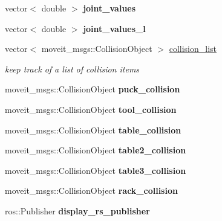 \begin{DoxyCompactItemize}
vector$<$ double $>$ {\bfseries joint\+\_\+values}
\item 
\mbox{\label{structManipulate_ae76888a71e1ac9ccb80b4bd1d4ffe944}} 
vector$<$ double $>$ {\bfseries joint\+\_\+values\+\_\+l}
\item 
\mbox{\label{structManipulate_a7cc8e6a4a253a98554ec30b616db1fbc}} 
vector$<$ moveit\+\_\+msgs\+::\+Collision\+Object $>$ \hyperlink{structManipulate_a7cc8e6a4a253a98554ec30b616db1fbc}{collision\+\_\+list}
\begin{DoxyCompactList}\small\item\em keep track of a list of collision items \end{DoxyCompactList}\item 
\mbox{\label{structManipulate_acc3904b461118f4e8330299129c02cd0}} 
moveit\+\_\+msgs\+::\+Collision\+Object {\bfseries puck\+\_\+collision}
\item 
\mbox{\label{structManipulate_a148b916c270012e9abef314e1efae9de}} 
moveit\+\_\+msgs\+::\+Collision\+Object {\bfseries tool\+\_\+collision}
\item 
\mbox{\label{structManipulate_a7adcb07d0adaa5a2ba43c087258c3c57}} 
moveit\+\_\+msgs\+::\+Collision\+Object {\bfseries table\+\_\+collision}
\item 
\mbox{\label{structManipulate_a2284721a34a4d4477afc33e3e85679c8}} 
moveit\+\_\+msgs\+::\+Collision\+Object {\bfseries table2\+\_\+collision}
\item 
\mbox{\label{structManipulate_a641503dea63727c7ba4d7d86647daba3}} 
moveit\+\_\+msgs\+::\+Collision\+Object {\bfseries table3\+\_\+collision}
\item 
\mbox{\label{structManipulate_a20a02124f1e0265b5a0188b72690b1cb}} 
moveit\+\_\+msgs\+::\+Collision\+Object {\bfseries rack\+\_\+collision}
\item 
\mbox{\label{structManipulate_a0b62b811945feb321f2491196187f166}} 
ros\+::\+Publisher {\bfseries display\+\_\+rs\+\_\+publisher}
\item 

\end{DoxyCompactItemize}
